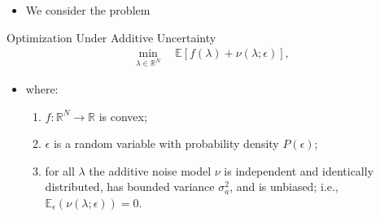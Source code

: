 \documentclass[11pt]{beamer}
\newcommand{\R}{\mathbb{R}}
\begin{document}
\begin{frame}

\begin{itemize}
	
	
	\item We consider the problem

\end{itemize}

\begin{block}{Optimization Under Additive Uncertainty \footnotemark[1]}
\begin{eqnarray} \label{eq:9}
\min_{\lambda \in \R^N} \quad \mathbb{E}\left[f(\lambda)+\nu (\lambda; \epsilon)\right],
\end{eqnarray} 


\begin{itemize}

\item where:

\begin{enumerate}[(i.)]

	\item $f: \R^N \to \R$ is convex;

	\item $\epsilon$ is a random variable with probability density $P(\epsilon)$;

	\item for all $\lambda$ the additive noise model $\nu$ is independent and identically distributed, has bounded variance $\sigma_a^2$, and is unbiased; i.e., $\mathbb{E}_\epsilon (\nu(\lambda;\epsilon))=0$.

\end{enumerate}


\end{itemize}


\end{block}


\end{frame}
\end{document}
